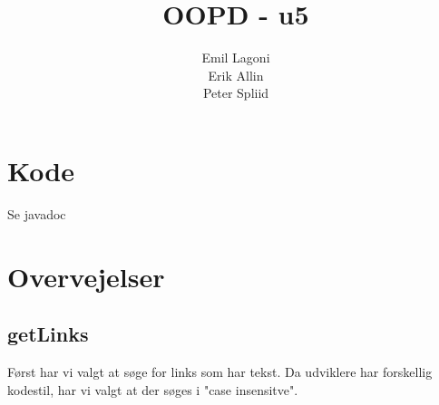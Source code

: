 \documentclass[a4paper,11pt]{article}
\title{\textbf{OOPD - u5}}
\author{Emil Lagoni\\Erik Allin\\Peter Spliid}
\begin{document}
\maketitle

\section*{Kode}
Se javadoc

\section*{Overvejelser}
\subsection*{getLinks}
Først har vi valgt at søge for links som har tekst. Da udviklere har forskellig kodestil, har vi valgt at der søges i "case insensitve".
\end{document}
